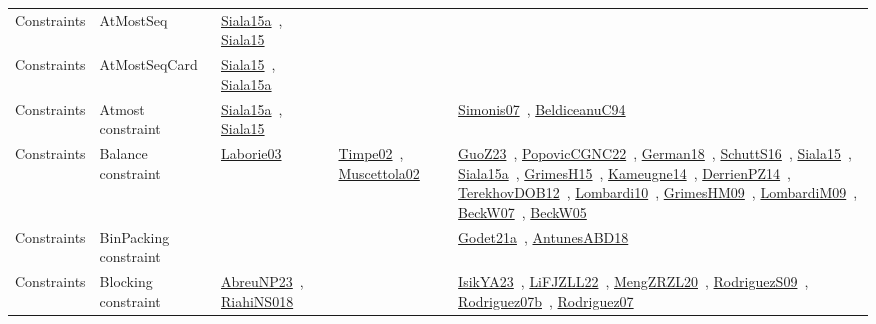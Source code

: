 {\begin{longtable}{lp{3cm}>{\raggedright\arraybackslash}p{6cm}>{\raggedright\arraybackslash}p{6cm}>{\raggedright\arraybackslash}p{8cm}}
Constraints & AtMostSeq & \href{../works/Siala15a.pdf}{Siala15a}~\cite{Siala15a}, \href{../works/Siala15.pdf}{Siala15}~\cite{Siala15} &  & \\
Constraints & AtMostSeqCard & \href{../works/Siala15.pdf}{Siala15}~\cite{Siala15}, \href{../works/Siala15a.pdf}{Siala15a}~\cite{Siala15a} &  & \\
Constraints & Atmost constraint & \href{../works/Siala15a.pdf}{Siala15a}~\cite{Siala15a}, \href{../works/Siala15.pdf}{Siala15}~\cite{Siala15} &  & \href{../works/Simonis07.pdf}{Simonis07}~\cite{Simonis07}, \href{../works/BeldiceanuC94.pdf}{BeldiceanuC94}~\cite{BeldiceanuC94}\\
Constraints & Balance constraint & \href{../works/Laborie03.pdf}{Laborie03}~\cite{Laborie03} & \href{../works/Timpe02.pdf}{Timpe02}~\cite{Timpe02}, \href{../works/Muscettola02.pdf}{Muscettola02}~\cite{Muscettola02} & \href{../works/GuoZ23.pdf}{GuoZ23}~\cite{GuoZ23}, \href{../works/PopovicCGNC22.pdf}{PopovicCGNC22}~\cite{PopovicCGNC22}, \href{../works/German18.pdf}{German18}~\cite{German18}, \href{../works/SchuttS16.pdf}{SchuttS16}~\cite{SchuttS16}, \href{../works/Siala15.pdf}{Siala15}~\cite{Siala15}, \href{../works/Siala15a.pdf}{Siala15a}~\cite{Siala15a}, \href{../works/GrimesH15.pdf}{GrimesH15}~\cite{GrimesH15}, \href{../works/Kameugne14.pdf}{Kameugne14}~\cite{Kameugne14}, \href{../works/DerrienPZ14.pdf}{DerrienPZ14}~\cite{DerrienPZ14}, \href{../works/TerekhovDOB12.pdf}{TerekhovDOB12}~\cite{TerekhovDOB12}, \href{../works/Lombardi10.pdf}{Lombardi10}~\cite{Lombardi10}, \href{../works/GrimesHM09.pdf}{GrimesHM09}~\cite{GrimesHM09}, \href{../works/LombardiM09.pdf}{LombardiM09}~\cite{LombardiM09}, \href{../works/BeckW07.pdf}{BeckW07}~\cite{BeckW07}, \href{../works/BeckW05.pdf}{BeckW05}~\cite{BeckW05}\\
Constraints & BinPacking constraint &  &  & \href{../works/Godet21a.pdf}{Godet21a}~\cite{Godet21a}, \href{../works/AntunesABD18.pdf}{AntunesABD18}~\cite{AntunesABD18}\\
Constraints & Blocking constraint & \href{../works/AbreuNP23.pdf}{AbreuNP23}~\cite{AbreuNP23}, \href{../works/RiahiNS018.pdf}{RiahiNS018}~\cite{RiahiNS018} &  & \href{../works/IsikYA23.pdf}{IsikYA23}~\cite{IsikYA23}, \href{../works/LiFJZLL22.pdf}{LiFJZLL22}~\cite{LiFJZLL22}, \href{../works/MengZRZL20.pdf}{MengZRZL20}~\cite{MengZRZL20}, \href{../works/RodriguezS09.pdf}{RodriguezS09}~\cite{RodriguezS09}, \href{../works/Rodriguez07b.pdf}{Rodriguez07b}~\cite{Rodriguez07b}, \href{../works/Rodriguez07.pdf}{Rodriguez07}~\cite{Rodriguez07}\\

\end{longtable}}
